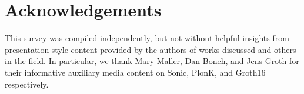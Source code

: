 \section*{Acknowledgements}

\noindent This survey was compiled independently, but not without helpful insights from presentation-style content provided by the authors of works discussed and others in the field. In particular, we thank Mary Maller, Dan Boneh, and Jens Groth for their informative auxiliary media content on Sonic, PlonK, and Groth16 respectively.
